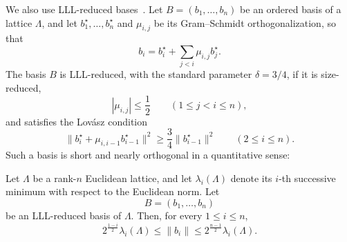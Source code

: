 We also use LLL-reduced bases~\cite{LLL82}.
Let \(B=(b_1,\ldots,b_n)\) be an ordered basis of a lattice \(\Lambda\), and let
\(b_1^\star,\ldots,b_n^\star\) and \(\mu_{i,j}\) be its Gram--Schmidt
orthogonalization, so that
\[
    b_i=b_i^\star+\sum_{j<i}\mu_{i,j}b_j^\star .
\]
The basis \(B\) is LLL-reduced, with the standard parameter
\(\delta=3/4\), if it is size-reduced,
\[
    |\mu_{i,j}|\le \frac12
    \qquad (1\le j<i\le n),
\]
and satisfies the Lovász condition
\[
    \|b_i^\star+\mu_{i,i-1}b_{i-1}^\star\|^2
    \ge
    \frac34\|b_{i-1}^\star\|^2
    \qquad (2\le i\le n).
\]
Such a basis is short and nearly orthogonal in a quantitative sense:
\begin{lemma}
\label{lem:lll-successive-minima}
Let \(\Lambda\) be a rank-\(n\) Euclidean lattice, and let
\(\lambda_i(\Lambda)\) denote its \(i\)-th successive minimum with respect
to the Euclidean norm.  Let
\[
    B=(b_1,\ldots,b_n)
\]
be an LLL-reduced basis of \(\Lambda\). Then, for every \(1\le i\le n\),
\[
    2^{\frac{1-i}{2}}
    \lambda_i(\Lambda)
    \le
    \|b_i\|
    \le
    2^{\frac{n-1}{2}}
    \lambda_i(\Lambda).
\]
\end{lemma}


